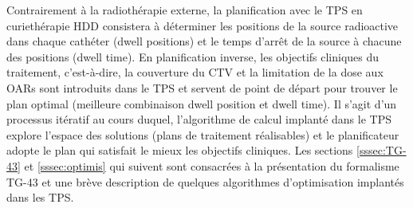 %
Contrairement à la radiothérapie externe, la planification avec le TPS en curiethérapie HDD consistera à déterminer les positions de la source radioactive dans chaque cathéter (dwell positions) et le temps d’arrêt de la source à chacune des positions (dwell time). En planification inverse, les objectifs cliniques du traitement, c’est-à-dire, la couverture du CTV et la limitation de la dose aux OARs sont introduits dans le TPS et servent de point de départ pour trouver le plan optimal (meilleure combinaison dwell position et dwell time). Il s’agit d’un processus itératif au cours duquel, l’algorithme de calcul implanté dans le TPS explore l'espace des solutions (plans de traitement réalisables) et le planificateur adopte le plan qui satisfait le mieux les objectifs cliniques. Les sections \ref{sssec:TG-43} et \ref{sssec:optimis} qui suivent sont consacrées à la présentation du formalisme TG-43 et une brève description de quelques algorithmes d’optimisation implantés dans les TPS.
%
